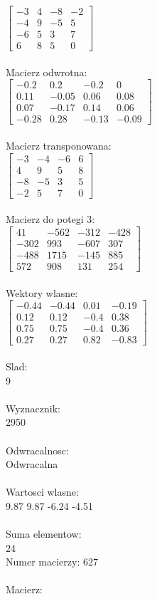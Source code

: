\documentclass[a4paper,12pt]{article}
\begin{document}
$\begin{bmatrix} -3&4&-8&-2\\-4&9&-5&5\\-6&5&3&7\\6&8&5&0 \end{bmatrix}$
\\
\\
Macierz odwrotna:\\

$\begin{bmatrix} -0.2&0.2&-0.2&0\\0.11&-0.05&0.06&0.08\\0.07&-0.17&0.14&0.06\\-0.28&0.28&-0.13&-0.09 \end{bmatrix}$
\\
\\
Macierz transponowana:\\

$\begin{bmatrix} -3&-4&-6&6\\4&9&5&8\\-8&-5&3&5\\-2&5&7&0 \end{bmatrix}$
\\
\\
Macierz do potegi 3:\\

$\begin{bmatrix} 41&-562&-312&-428\\-302&993&-607&307\\-488&1715&-145&885\\572&908&131&254 \end{bmatrix}$
\\
\\
Wektory wlasne:\\

$\begin{bmatrix} -0.44&-0.44&0.01&-0.19\\0.12&0.12&-0.4&0.38\\0.75&0.75&-0.4&0.36\\0.27&0.27&0.82&-0.83 \end{bmatrix}$
\\
\\
Slad:\\
9
\\
\\
Wyznacznik:\\
2950
\\
\\
Odwracalnosc:\\
Odwracalna
\\
\\
Wartosci wlasne:\\
9.87 9.87 -6.24 -4.51
\\
\\
Suma elementow:\\
24
\\
\newpage
Numer macierzy:
627
\\
\\
Macierz:\\
\end{document}
